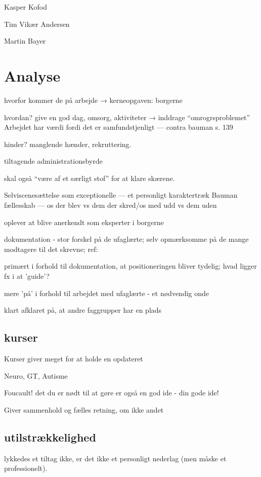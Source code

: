 Kasper Kofod

Tim Vikær Andersen

Martin Bayer

\section{Analyse}
hvorfor kommer de på arbejde → kerneopgaven: borgerne

hvordan? give en god dag, omsorg, aktiviteter → inddrage “omrogrsproblemet” \autocite[s.455ff]{hansbolKonstruktionAfProfessionel2008}
Arbejdet har værdi fordi det er samfundstjenligt — contra bauman s. 139

hinder? manglende hænder, rekruttering.

tiltagende administrationsbyrde \autocite[s. 16]{mik-meyerIndledningSkabeProfessionel2012}

skal også “være af et særligt stof” for at klare skærene.

Selviscenesættelse som exceptionelle --- et personligt karaktertræk
Bauman fællesskab — os der blev vs dem der skred/os med udd vs dem uden

oplever at blive anerkendt som eksperter i borgerne

dokumentation - stor forskel på de ufaglærte; selv opmærksomme på de mange modtagere til det skrevne; ref: \autocite{hjerrildNarViSkriver2017, andersenUndervisningInstitutionOg2019}

primært i forhold til dokumentation, at positioneringen bliver tydelig; hvad ligger fx i at 'guide'?

mere 'på' i forhold til arbejdet med ufaglærte - et nødvendig onde

klart afklaret på, at andre faggrupper har en plads

\subsection{kurser}
Kurser giver meget for at holde en opdateret

Neuro, GT, Autisme

Foucault! det du er nødt til at gøre er også en god ide - din gode ide!

Giver sammenhold og fælles retning, om ikke andet

\subsection{utilstrækkelighed}
lykkedes et tiltag ikke, er det ikke et personligt nederlag (men måske et professionelt).

